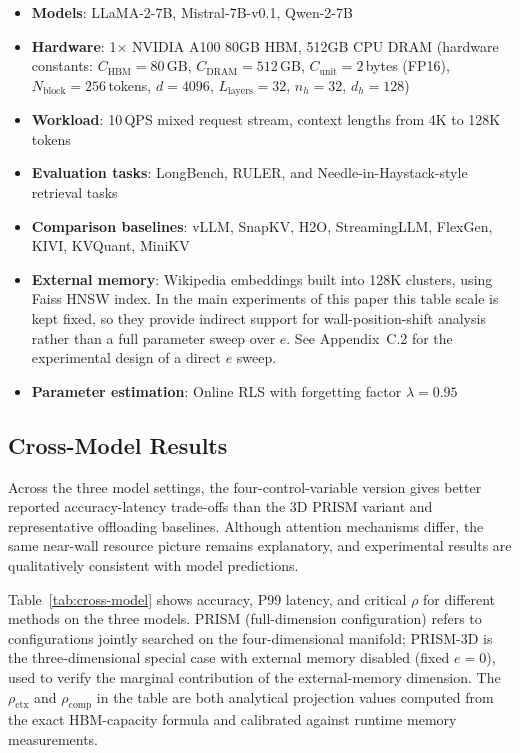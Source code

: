 \documentclass[11pt,a4paper]{article}
\theoremstyle{plain}
\theoremstyle{definition}
\begin{document}
\begin{itemize}
    \item \textbf{Models}: LLaMA-2-7B, Mistral-7B-v0.1, Qwen-2-7B
    \item \textbf{Hardware}: 1$\times$ NVIDIA A100 80GB HBM, 512GB CPU DRAM (hardware constants: $C_{\text{HBM}}=80$\,GB, $C_{\text{DRAM}}=512$\,GB, $C_{\text{unit}}=2$\,bytes (FP16), $N_{\text{block}}=256$\,tokens, $d=4096$, $L_{\text{layers}}=32$, $n_h=32$, $d_h=128$)
    \item \textbf{Workload}: 10\,QPS mixed request stream, context lengths from 4K to 128K tokens
    \item \textbf{Evaluation tasks}: LongBench, RULER, and Needle-in-Haystack-style retrieval tasks
    \item \textbf{Comparison baselines}: vLLM, SnapKV, H2O, StreamingLLM, FlexGen, KIVI, KVQuant, MiniKV
    \item \textbf{External memory}: Wikipedia embeddings built into 128K clusters, using Faiss HNSW index. In the main experiments of this paper this table scale is kept fixed, so they provide indirect support for wall-position-shift analysis rather than a full parameter sweep over $e$. See Appendix~C.2 for the experimental design of a direct $e$ sweep.
    \item \textbf{Parameter estimation}: Online RLS with forgetting factor $\lambda = 0.95$
\end{itemize}

\subsection{Cross-Model Results}\label{sec:cross-model}

Across the three model settings, the four-control-variable version gives better reported accuracy-latency trade-offs than the 3D PRISM variant and representative offloading baselines. Although attention mechanisms differ, the same near-wall resource picture remains explanatory, and experimental results are qualitatively consistent with model predictions.

Table~\ref{tab:cross-model} shows accuracy, P99 latency, and critical $\rho$ for different methods on the three models. PRISM (full-dimension configuration) refers to configurations jointly searched on the four-dimensional manifold; PRISM-3D is the three-dimensional special case with external memory disabled (fixed $e=0$), used to verify the marginal contribution of the external-memory dimension. The $\rho_{\text{ctx}}$ and $\rho_{\text{comp}}$ in the table are both analytical projection values computed from the exact HBM-capacity formula and calibrated against runtime memory measurements.
\end{document}
